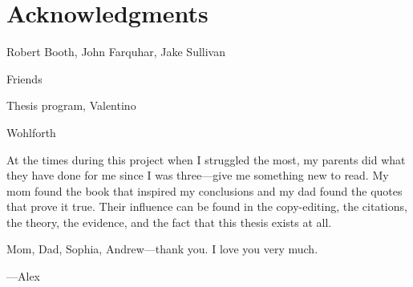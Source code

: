 \chapter*{Acknowledgments}
\begin{noparindent}

Robert Booth, John Farquhar, Jake Sullivan

Friends

Thesis program, Valentino

Wohlforth

At the times during this project when I struggled the most, my parents did what they have done for me since I was three---give me something new to read. My mom found the book that inspired my conclusions and my dad found the quotes that prove it true. Their influence can be found in the copy-editing, the citations, the theory, the evidence, and the fact that this thesis exists at all.

Mom, Dad, Sophia, Andrew---thank you. I love you very much.

---Alex

\end{noparindent}
\newpage
